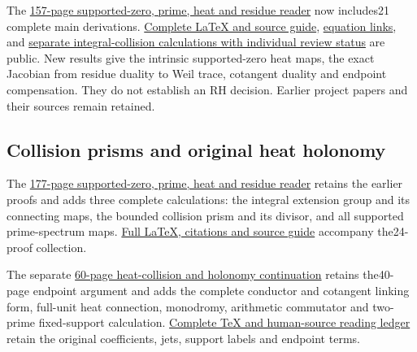 \documentclass[
]{article}
\begin{document}
The
\href{https://github.com/KokunoYumeto/zeta-function-research-reader/blob/main/workbenches/splitzero-tandem/branches/tau-zero-prime-positivity/TAU_ZERO_PRIME_POSITIVITY.pdf}{157-page
supported-zero, prime, heat and residue reader} now includes21 complete
main derivations.
\href{https://github.com/KokunoYumeto/zeta-function-research-reader/blob/main/workbenches/splitzero-tandem/branches/tau-zero-prime-positivity/PUBLICATION_COMPANION.md}{Complete
LaTeX and source guide},
\href{https://github.com/KokunoYumeto/zeta-function-research-reader/blob/main/workbenches/splitzero-tandem/branches/tau-zero-prime-positivity/PUBLICATION_INDEX.json}{equation
links}, and
\href{https://github.com/KokunoYumeto/zeta-function-research-reader/blob/main/workbenches/splitzero-tandem/branches/tau-zero-prime-positivity/research_calculations/STATUS.json}{separate
integral-collision calculations with individual review status} are
public. New results give the intrinsic supported-zero heat maps, the
exact Jacobian from residue duality to Weil trace, cotangent duality and
endpoint compensation. They do not establish an RH decision. Earlier
project papers and their sources remain retained.

\subsection{Collision prisms and original heat
holonomy}\label{collision-prisms-and-original-heat-holonomy}

The
\href{https://github.com/KokunoYumeto/zeta-function-research-reader/blob/main/workbenches/splitzero-tandem/branches/tau-zero-prime-positivity/TAU_ZERO_PRIME_POSITIVITY.pdf}{177-page
supported-zero, prime, heat and residue reader} retains the earlier
proofs and adds three complete calculations: the integral extension
group and its connecting maps, the bounded collision prism and its
divisor, and all supported prime-spectrum maps.
\href{https://github.com/KokunoYumeto/zeta-function-research-reader/blob/main/workbenches/splitzero-tandem/branches/tau-zero-prime-positivity/PUBLICATION_COMPANION.md}{Full
LaTeX, citations and source guide} accompany the24-proof collection.

The separate
\href{https://github.com/KokunoYumeto/zeta-function-research-reader/blob/main/workbenches/splitzero-tandem/continuations/20260923-supported-zero-collision-holonomy/SUPPORTED_ZERO_COLLISION_HOLONOMY.pdf}{60-page
heat-collision and holonomy continuation} retains the40-page endpoint
argument and adds the complete conductor and cotangent linking form,
full-unit heat connection, monodromy, arithmetic commutator and
two-prime fixed-support calculation.
\href{https://github.com/KokunoYumeto/zeta-function-research-reader/blob/main/workbenches/splitzero-tandem/continuations/20260923-supported-zero-collision-holonomy/README.md}{Complete
TeX and human-source reading ledger} retain the original coefficients,
jets, support labels and endpoint terms.
\end{document}
